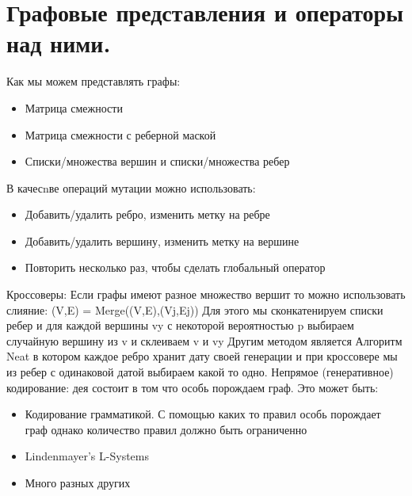 \section{Графовые представления и операторы над ними.}
Как мы можем представлять графы:
\begin{itemize}
	\item Матрица смежности
	\item Матрица смежности с реберной маской
	\item Списки/множества вершин и списки/множества ребер
\end{itemize}
В качесnве операций мутации можно использовать:
\begin{itemize}
	\item Добавить/удалить ребро, изменить метку на ребре
	\item Добавить/удалить вершину, изменить метку на вершине
	\item Повторить несколько раз, чтобы сделать глобальный оператор
\end{itemize}
Кроссоверы:
Если графы имеют разное множество вершит то можно использовать слияние: (V,E) = Merge((V,E),(Vj,Ej))
Для этого мы сконкатенируем списки ребер и для каждой вершины vy с некоторой вероятностью p выбираем случайную вершину из v и склеиваем v и vy
Другим методом является Алгоритм Neat в котором каждое ребро хранит дату своей генерации и при кроссовере мы из ребер с одинаковой датой выбираем какой то одно. 
Непрямое (генеративное) кодирование:
дея состоит в том что особь порождаем граф. Это может быть:
\begin{itemize}
	\item Кодирование грамматикой. С помощью каких то правил особь порождает граф однако количество правил должно быть ограниченно 
	\item Lindenmayer’s L-Systems
	\item Много разных других
\end{itemize}

